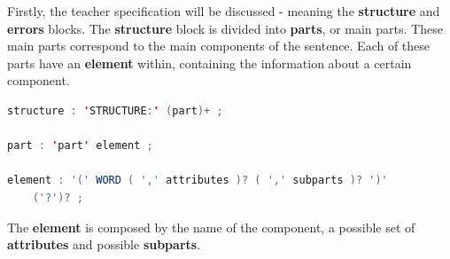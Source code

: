 
Firstly, the teacher specification will be discussed - meaning the \textbf{structure} and \textbf{errors} blocks.
The \textbf{structure} block is divided into \textbf{parts}, or main parts. These main parts correspond to the main components of the sentence. Each of these parts have an \textbf{element} within, containing the information about a certain component.

\begin{center}
\begin{minipage}{14cm}
\begin{lstlisting}[language=java, basicstyle=\small, label={lst:dsl_struct_prod}, caption=DSL structure/part/element productions]
structure : 'STRUCTURE:' (part)+ ;

part : 'part' element ;

element : '(' WORD ( ',' attributes )? ( ',' subparts )? ')' 
    ('?')? ;
\end{lstlisting}
\end{minipage}
\end{center}

%
%


The \textbf{element} is composed by the name of the component, a possible set of \textbf{attributes} and possible \textbf{subparts}.

